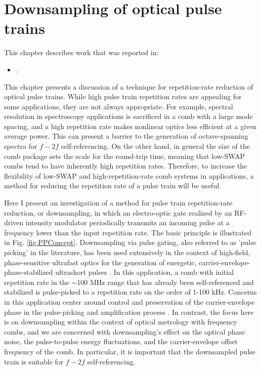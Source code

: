  \chapter{Downsampling of optical pulse trains} \label{chap:PulsePicking}
    \begin{footnotesize}
 	\begin{spacing}{1.2}
 		This chapter describes work that was reported in:
 		\begin{itemize}
 			\item {}.\\
 		\end{itemize}
 	\end{spacing}
 \end{footnotesize}
 

This chapter presents a discussion of a technique for repetition-rate reduction of optical pulse trains. While high pulse train repetition rates are appealing for some applications, they are not always appropriate. For example, spectral resolution in spectroscopy applications is sacrificed in a comb with a large mode spacing, and a high repetition rate makes nonlinear optics less efficient at a given average power. This can present a barrier to the generation of octave-spanning spectra for $f-2f$ self-referencing. On the other hand, in general the size of the comb package sets the scale for the round-trip time, meaning that low-SWAP combs tend to have inherently high repetition rates. Therefore, to increase the flexibility of low-SWAP and high-repetition-rate comb systems in applications, a method for reducing the repetition rate of a pulse train will be useful.

Here I present an investigation of a method for pulse train repetition-rate reduction, or downsampling, in which an electro-optic gate realized by an RF-driven intensity modulator periodically transmits an incoming pulse at a frequency lower than the input repetition rate. The basic principle is illustrated in Fig. \ref{fig:PPConcept}. Downsampling via pulse gating, also referred to as 'pulse picking' in the literature, has been used extensively in the context of high-field, phase-sensitive ultrafast optics for the generation of energetic, carrier-envelope-phase-stabilized ultrashort pulses \cite{Backus1998,Baltuska2003}. In this application, a comb with initial repetition rate in the $\sim$100 MHz range that has already been self-referenced and stabilized is pulse-picked to a repetition rate on the order of 1-100 kHz. Concerns in this application center around control and preservation of the carrier-envelope phase in the pulse-picking and amplification process \cite{Gohle2005,Rauschenberger2006}. In contrast, the focus here is on downsampling within the context of optical metrology with frequency combs, and we are concerned with downsampling's effect on the optical phase noise, the pulse-to-pulse energy fluctuations, and the carrier-envelope offset frequency of the comb. In particular, it is important that the downsampled pulse train is suitable for $f-2f$ self-referencing. 

